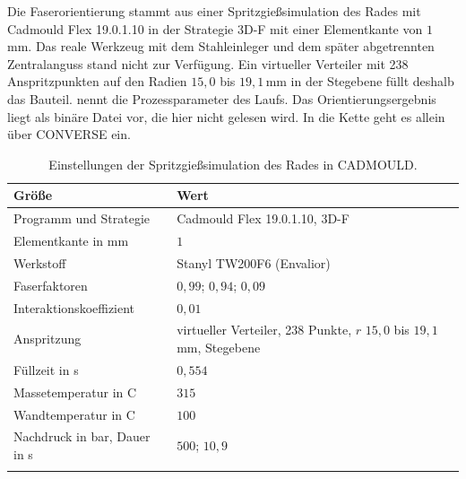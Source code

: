 Die Faserorientierung stammt aus einer Spritzgießsimulation des Rades mit Cadmould Flex 19.0.1.10 in der Strategie 3D-F mit einer Elementkante von $1$\,mm. Das reale Werkzeug mit dem Stahleinleger und dem später abgetrennten Zentralanguss stand nicht zur Verfügung. Ein virtueller Verteiler mit 238 Anspritzpunkten auf den Radien $15{,}0$ bis $19{,}1$\,mm in der Stegebene füllt deshalb das Bauteil.  nennt die Prozessparameter des Laufs. Das Orientierungsergebnis liegt als binäre Datei vor, die hier nicht gelesen wird. In die Kette geht es allein über CONVERSE ein.

\begin{table}[htbp]
	\caption{Einstellungen der Spritzgießsimulation des Rades in CADMOULD.}
	\label{tab:cadmould}
	\centering
	\small
	\begin{tabular}{ll}
		\hline
		Größe                            & Wert                                                                       \\
		\hline
		\arrayrulecolor{black!30}
		Programm und Strategie           & Cadmould Flex 19.0.1.10, 3D-F                                              \\
		\hline
		Elementkante in mm               & $1$                                                                        \\
		\hline
		Werkstoff                        & Stanyl TW200F6 (Envalior)                                                  \\
		\hline
		Faserfaktoren                    & $0{,}99$; $0{,}94$; $0{,}09$                                               \\
		\hline
		Interaktionskoeffizient          & $0{,}01$                                                                   \\
		\hline
		Anspritzung                      & virtueller Verteiler, 238 Punkte, $r$ $15{,}0$ bis $19{,}1$\,mm, Stegebene \\
		\hline
		Füllzeit in s                    & $0{,}554$                                                                  \\
		\hline
		Massetemperatur in \textdegree C & $315$                                                                      \\
		\hline
		Wandtemperatur in \textdegree C  & $100$                                                                      \\
		\hline
		Nachdruck in bar, Dauer in s     & $500$; $10{,}9$                                                            \\
		\arrayrulecolor{black}
		\hline
	\end{tabular}
\end{table}

